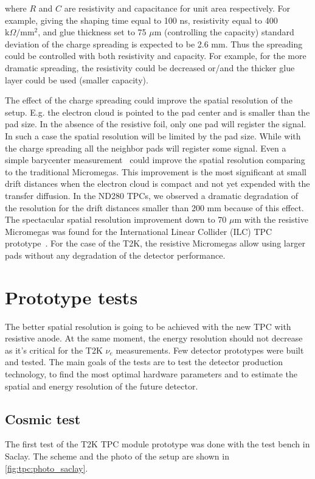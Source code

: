 \documentclass[../main.tex]{subfiles}
\begin{document}
where $R$ and $C$ are resistivity and capacitance for unit area respectively. For example, giving the shaping time equal to 100 ns, resistivity equal to 400 $\text{k}\Omega/\text{mm}^2$, and glue thickness set to 75 $\mu\text{m}$ (controlling the capacity) standard deviation of the charge spreading is expected to be 2.6 mm. Thus the spreading could be controlled with both resistivity and capacity. For example, for the more dramatic spreading, the resistivity could be decreased or/and the thicker glue layer could be used (smaller capacity).

The effect of the charge spreading could improve the spatial resolution of the setup. E.g. the electron cloud is pointed to the pad center and is smaller than the pad size. In the absence of the resistive foil, only one pad will register the signal. In such a case the spatial resolution will be limited by the pad size. While with the charge spreading all the neighbor pads will register some signal. Even a simple barycenter measurement~\cite{Dixit2004} could improve the spatial resolution comparing to the traditional Micromegas. This improvement is the most significant at small drift distances when the electron cloud is compact and not yet expended with the transfer diffusion. In the ND280 TPCs, we observed a dramatic degradation of the resolution for the drift distances smaller than 200 mm because of this effect. The spectacular spatial resolution improvement down to 70 $\mu\text{m}$ with the resistive Micromegas was found for the International Linear Collider (ILC) TPC prototype~\cite{Attie2011}. For the case of the T2K, the resistive Micromegas allow using larger pads without any degradation of the detector performance.

\section{Prototype tests}
The better spatial resolution is going to be achieved with the new TPC with resistive anode. At the same moment, the energy resolution should not decrease as it's critical for the T2K $\nu_e$ measurements. Few detector prototypes were built and tested. The main goals of the tests are to test the detector production technology, to find the most optimal hardware parameters and to estimate the spatial and energy resolution of the future detector.

\subsection{Cosmic test}
\label{sec:up:saclay}
The first test of the T2K TPC module prototype  was done with the test bench in Saclay. The scheme and the photo of the setup are shown in \autoref{fig:tpc:photo_saclay}.
\end{document}
